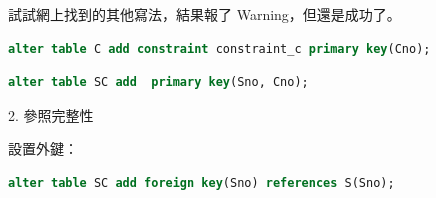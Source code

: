\documentclass[12pt, a4paper]{report}
\begin{document}
試試網上找到的其他寫法，結果報了 Warning，但還是成功了。\\

\begin{lstlisting}[language=SQL]
    alter table C add constraint constraint_c primary key(Cno);
\end{lstlisting}

\begin{figure}[H] %
    \centering %
\end{figure}

\begin{lstlisting}[language=SQL]
    alter table SC add  primary key(Sno, Cno);
\end{lstlisting}

\begin{figure}[H] %
    \centering %
\end{figure}
2. 參照完整性

設置外鍵：\\

\begin{lstlisting}[language=SQL]
    alter table SC add foreign key(Sno) references S(Sno);
\end{lstlisting}
\end{document}
